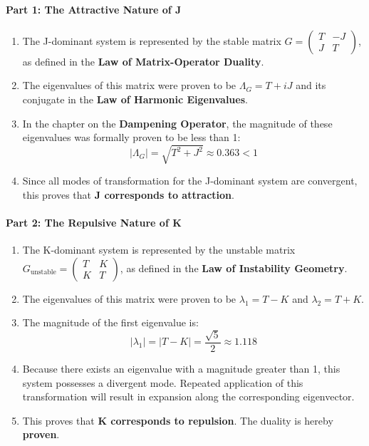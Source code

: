 \paragraph{Part 1: The Attractive Nature of J}
\begin{enumerate}
    \item The J-dominant system is represented by the stable matrix $G = \begin{pmatrix} T & -J \\ J & T \end{pmatrix}$, as defined in the \textbf{Law of Matrix-Operator Duality}.
    \item The eigenvalues of this matrix were proven to be $\Lambda_G = T+iJ$ and its conjugate in the \textbf{Law of Harmonic Eigenvalues}.
    \item In the chapter on the \textbf{Dampening Operator}, the magnitude of these eigenvalues was formally proven to be less than 1:
    $$ |\Lambda_G| = \sqrt{T^2+J^2} \approx 0.363 < 1 $$
    \item Since all modes of transformation for the J-dominant system are convergent, this proves that \textbf{J corresponds to attraction}.
\end{enumerate}

\paragraph{Part 2: The Repulsive Nature of K}
\begin{enumerate}
    \item The K-dominant system is represented by the unstable matrix $G_{\text{unstable}} = \begin{pmatrix} T & K \\ K & T \end{pmatrix}$, as defined in the \textbf{Law of Instability Geometry}.
    \item The eigenvalues of this matrix were proven to be $\lambda_1 = T-K$ and $\lambda_2 = T+K$.
    \item The magnitude of the first eigenvalue is:
    $$ |\lambda_1| = |T-K| = \frac{\sqrt{5}}{2} \approx 1.118 $$
    \item Because there exists an eigenvalue with a magnitude greater than 1, this system possesses a divergent mode. Repeated application of this transformation will result in expansion along the corresponding eigenvector.
    \item This proves that \textbf{K corresponds to repulsion}. The duality is hereby \textbf{proven}.
\end{enumerate}

